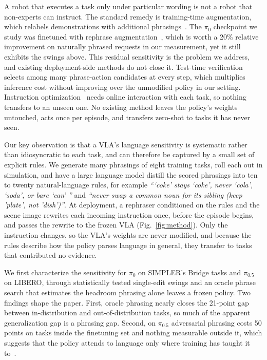 \documentclass[letterpaper, 10 pt, conference]{ieeeconf} %
\begin{document}
A robot that executes a task only under particular wording is not a robot that non-experts can instruct. The standard remedy is training-time augmentation, which relabels demonstrations with additional phrasings~\cite{kwok2026scaling, xiao2023dial}. The $\pi_0$ checkpoint we study was finetuned with rephrase augmentation~\cite{intact}, which is worth a 20\% relative improvement on naturally phrased requests in our measurement, yet it still exhibits the swings above. This residual sensitivity is the problem we address, and existing deployment-side methods do not close it. Test-time verification~\cite{kwok2025robomonkey, kwok2026scaling} selects among many phrase-action candidates at every step, which multiplies inference cost without improving over the unmodified policy in our setting. Instruction optimization~\cite{bhatia2026sarl, shodiev2026grounder, myers2024palo} needs online interaction with each task, so nothing transfers to an unseen one. No existing method leaves the policy's weights untouched, acts once per episode, and transfers zero-shot to tasks it has never seen.

Our key observation is that a VLA's language sensitivity is systematic rather than idiosyncratic to each task, and can therefore be captured by a small set of explicit rules. We generate many phrasings of eight training tasks, roll each out in simulation, and have a large language model distill the scored phrasings into ten to twenty natural-language rules, for example \textit{```coke' stays `coke', never `cola', `soda', or bare `can' ''} and \textit{``never swap a common noun for its sibling (keep 'plate', not 'dish')''}. At deployment, a rephraser conditioned on the rules and the scene image rewrites each incoming instruction once, before the episode begins, and passes the rewrite to the frozen VLA (Fig.~\ref{fig:method}). Only the instruction changes, so the VLA's weights are never modified, and because the rules describe how the policy parses language in general, they transfer to tasks that contributed no evidence.

We first characterize the sensitivity for $\pi_0$ on SIMPLER's Bridge tasks and $\pi_{0.5}$ on LIBERO, through statistically tested single-edit swings and an oracle phrase search that estimates the headroom phrasing alone leaves a frozen policy. Two findings shape the paper. First, oracle phrasing nearly closes the 21-point gap between in-distribution and out-of-distribution tasks, so much of the apparent generalization gap is a phrasing gap. Second, on $\pi_{0.5}$ adversarial phrasing costs 50 points on tasks inside the finetuning set and nothing measurable outside it, which suggests that the policy attends to language only where training has taught it to~\cite{zhou2025liberopro, fei2025liberoplus}.
\end{document}
